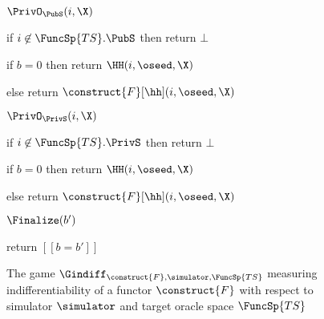 \begin{figure}
	
	{	\ExptSepSpace
		\begin{algorithm}{$\PrivO_{\PubS}(i,\X)$}
			\item if $i \not\in \FuncSp{TS}.\PubS$ then return $\bot$
			\item if $b = 0$ then return $\HH(i,\oseed, \X)$
			\item else return $\construct{F}[\hh](i,\oseed, \X)$
		\end{algorithm}	
		\ExptSepSpace
		\begin{algorithm}{$\PrivO_{\PrivS}(i,\X)$}
			\item if $i \not\in \FuncSp{TS}.\PrivS$ then return $\bot$
			\item if $b = 0$ then return $\HH(i,\oseed, \X)$
			\item else return $\construct{F}[\hh](i,\oseed, \X)$
		\end{algorithm}
		\ExptSepSpace
		\begin{algorithm}{$\Finalize(b')$}
			\item return $[[b = b']]$
		\end{algorithm}
	}
	\vspace{5pt}
	\caption{The game  $\Gindiff_{\construct{F}, \simulator, \FuncSp{TS}}$ measuring indifferentiability of a functor $\construct{F}$ with respect to simulator $\simulator$ and target oracle space $\FuncSp{TS}$}
	\label{fig-gm-indiff}
\end{figure}


